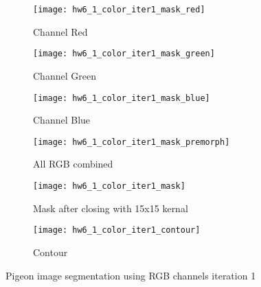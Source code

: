 \documentclass[11pt]{article}
\begin{document}
\begin{figure}[H]
\begin{subfigure}{.5\textwidth}
  \centering
  \texttt{[image: hw6\_1\_color\_iter1\_mask\_red]}
  \caption{Channel Red}
  \label{}
\end{subfigure}
\begin{subfigure}{.5\textwidth}
  \centering
  \texttt{[image: hw6\_1\_color\_iter1\_mask\_green]}
  \caption{Channel Green}
  \label{}
\end{subfigure}

\begin{subfigure}{.5\textwidth}
  \centering
  \texttt{[image: hw6\_1\_color\_iter1\_mask\_blue]}
  \caption{Channel Blue}
  \label{}
\end{subfigure}
\begin{subfigure}{.5\textwidth}
  \centering
  \texttt{[image: hw6\_1\_color\_iter1\_mask\_premorph]}
  \caption{All RGB combined}
  \label{}
\end{subfigure}

\begin{subfigure}{.5\textwidth}
  \centering
  \texttt{[image: hw6\_1\_color\_iter1\_mask]}
  \caption{Mask after closing with 15x15 kernal}
  \label{}
\end{subfigure}
\begin{subfigure}{.5\textwidth}
  \centering
  \texttt{[image: hw6\_1\_color\_iter1\_contour]}
  \caption{Contour}
  \label{}
\end{subfigure}

\caption{Pigeon image segmentation using RGB channels iteration 1}
\label{}
\end{figure}
\end{document}
